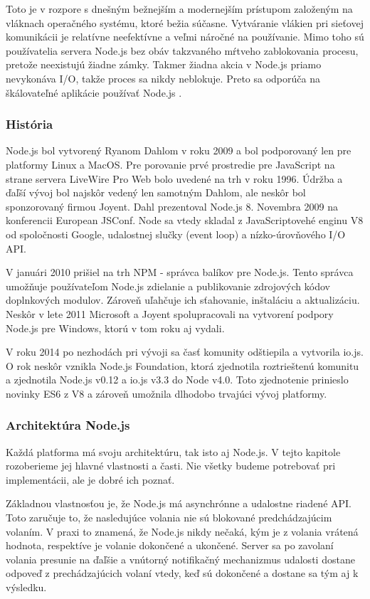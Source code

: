 \indent Toto je v rozpore s dnešným bežnejším a modernejším prístupom založeným na vláknach operačného systému, ktoré bežia súčasne. Vytváranie vlákien pri sieťovej komunikácii je relatívne neefektívne a veľmi náročné na používanie. Mimo toho sú používatelia servera Node.js bez obáv takzvaného mŕtveho zablokovania procesu, pretože neexistujú žiadne zámky. Takmer žiadna akcia v Node.js priamo nevykonáva I/O, takže proces sa nikdy neblokuje. Preto sa odporúča na škálovateľné aplikácie používať Node.js \cite{nodejs_1}.

\subsubsection{História}
\indent Node.js bol vytvorený Ryanom Dahlom v roku 2009 a bol podporovaný len pre platformy Linux a MacOS. Pre porovanie prvé prostredie pre JavaScript na strane servera LiveWire Pro Web bolo uvedené na trh v roku 1996. Údržba a ďaľší vývoj bol najskôr vedený len samotným Dahlom, ale neskôr bol sponzorovaný firmou Joyent. Dahl prezentoval Node.js 8. Novembra 2009 na konferencii European JSConf. Node sa vtedy skladal z JavaScriptovehé enginu V8 od spoločnosti Google, udalostnej slučky (event loop) a nízko-úrovňového I/O API.

\indent V januári 2010 prišiel na trh NPM - správca balíkov pre Node.js. Tento správca umožňuje používateľom Node.js zdielanie a publikovanie zdrojových kódov doplnkových modulov. Zároveň uľahčuje ich sťahovanie, inštaláciu a aktualizáciu. Neskôr v lete 2011 Microsoft a Joyent spolupracovali na vytvorení podpory Node.js pre Windows, ktorú v tom roku aj vydali. 

\indent V roku 2014 po nezhodách pri vývoji sa časť komunity odštiepila a vytvorila io.js. O rok neskôr vznikla Node.js Foundation, ktorá zjednotila roztrieštenú komunitu a zjednotila Node.js v0.12 a io.js v3.3 do Node v4.0. Toto zjednotenie prinieslo novinky ES6 z V8 a zároveň umožnila dlhodobo trvajúci vývoj platformy.

\subsubsection{Architektúra Node.js}
\indent Každá platforma má svoju architektúru, tak isto aj Node.js. V tejto kapitole rozoberieme jej hlavné vlastnosti a časti. Nie všetky budeme potrebovať pri implementácii, ale je dobré ich poznať.

\indent Základnou vlastnosťou je, že Node.js má asynchrónne a udalostne riadené API. Toto zaručuje to, že nasledujúce volania nie sú blokované predchádzajúcim volaním. V praxi to znamená, že Node.js nikdy nečaká, kým je z volania vrátená hodnota, respektíve je volanie dokončené a ukončené. Server sa po zavolaní volania presunie na ďaľšie a vnútorný notifikačný mechanizmus udalosti dostane odpoveď z prechádzajúcich volaní vtedy, keď sú dokončené a dostane sa tým aj k výsledku. 

